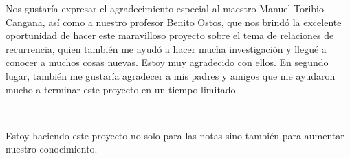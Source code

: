 Nos gustaría expresar el agradecimiento especial al maestro Manuel Toribio Cangana, así como a nuestro profesor Benito Ostos, que nos brindó la excelente oportunidad de hacer este maravilloso proyecto sobre el tema de relaciones de recurrencia, quien también me ayudó a hacer mucha investigación y llegué a conocer a muchos cosas nuevas. Estoy muy agradecido con ellos. En segundo lugar, también me gustaría agradecer a mis padres y amigos que me ayudaron mucho a terminar este proyecto en un tiempo limitado.\par

\

Estoy haciendo este proyecto no solo para las notas sino también para aumentar nuestro conocimiento.